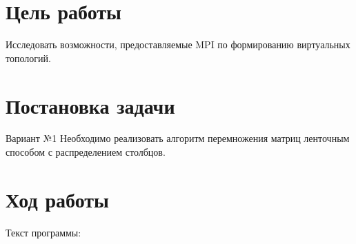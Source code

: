 \documentclass[a4paper,14pt]{extarticle}
\begin{document}


\section{Цель работы}
Исследовать возможности, предоставляемые MPI по формированию виртуальных
топологий.

\section{Постановка задачи}
Вариант №1 Необходимо реализовать алгоритм перемножения матриц ленточным
способом с распределением столбцов.

\section{Ход работы}
Текст программы:
\end{document}
